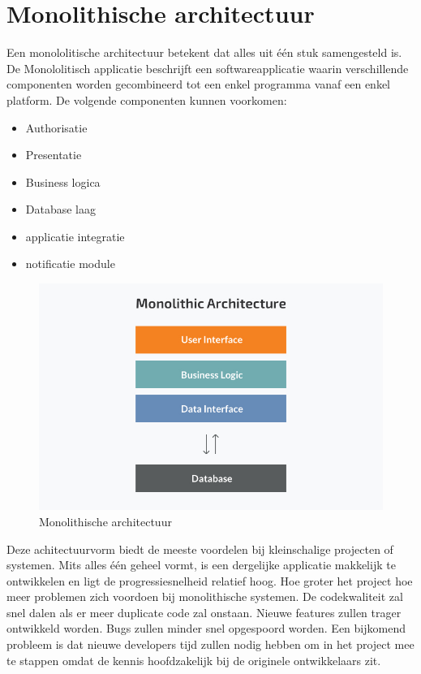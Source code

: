 \section{Monolithische architectuur}
Een monololitische architectuur betekent dat alles uit één stuk samengesteld is. De Monololitisch applicatie beschrijft een softwareapplicatie waarin verschillende componenten worden gecombineerd tot een enkel programma vanaf een enkel platform. De volgende componenten kunnen voorkomen:
\begin{itemize}
    \item Authorisatie
    \item Presentatie
    \item Business logica
    \item Database laag
    \item applicatie integratie
    \item notificatie module
\end{itemize}
\begin{figure}[!htb]
    \caption{Monolithische architectuur}
    \centering
    \includegraphics[width=1\textwidth]{Monoliet.png}
\end{figure}
Deze achitectuurvorm biedt de meeste voordelen bij kleinschalige projecten of systemen. Mits alles één geheel vormt, is een dergelijke applicatie makkelijk te ontwikkelen en ligt de progressiesnelheid relatief hoog. Hoe groter het project hoe meer problemen zich voordoen bij monolithische systemen. De codekwaliteit zal snel dalen als er meer duplicate code zal onstaan. Nieuwe features zullen trager ontwikkeld worden. Bugs zullen minder snel opgespoord worden. Een bijkomend probleem is dat nieuwe developers tijd zullen nodig hebben om in het project mee te stappen omdat de kennis hoofdzakelijk bij de originele ontwikkelaars zit. \\
